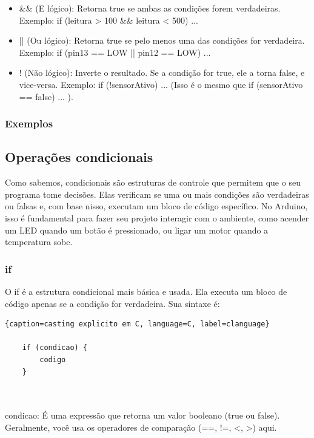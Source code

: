 \documentclass{report}
\begin{document}
	\begin{itemize}
		\item \&\& (E lógico): Retorna true se ambas as condições forem verdadeiras. Exemplo: if (leitura > 100 \&\& leitura < 500) { ... }
		\item || (Ou lógico): Retorna true se pelo menos uma das condições for verdadeira. Exemplo: if (pin13 == LOW || pin12 == LOW) { ... }
		\item ! (Não lógico): Inverte o resultado. Se a condição for true, ele a torna false, e vice-versa. Exemplo: if (!sensorAtivo) { ... } (Isso é o mesmo que if (sensorAtivo == false) { ... }).
	\end{itemize}
	
	
	\subsubsection{Exemplos}
	
	\subsection{Operações condicionais}
	Como sabemos, condicionais são estruturas de controle que permitem que o seu programa tome decisões. Elas verificam se uma ou mais condições são verdadeiras ou falsas e, com base nisso, executam um bloco de código específico. No Arduino, isso é fundamental para fazer seu projeto interagir com o ambiente, como acender um LED quando um botão é pressionado, ou ligar um motor quando a temperatura sobe.
	
	\subsubsection{if}
	O if é a estrutura condicional mais básica e usada. Ela executa um bloco de código apenas se a condição for verdadeira. Sua sintaxe é:
	
	\begin{center}
		
		\begin{lstlisting}{caption=casting explicito em C, language=C, label=clanguage}	
			
	if (condicao) {
		codigo
	}
			
			
		\end{lstlisting}
	\end{center}
	
	condicao: É uma expressão que retorna um valor booleano (true ou false). Geralmente, você usa os operadores de comparação (==, !=, <, >) aqui.
	
\end{document}
